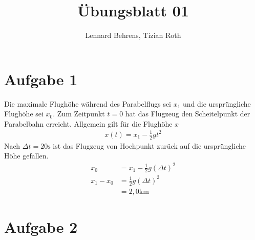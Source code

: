 \documentclass[a4paper,11pt]{article}
\title{Übungsblatt 01}
\author{Lennard Behrens, Tizian Roth}
\begin{document}
\maketitle

\section*{Aufgabe 1}
Die maximale Flughöhe während des Parabelflugs sei $x_1$ und die ursprüngliche Flughöhe sei $x_0$. Zum Zeitpunkt $t=0$ hat das Flugzeug den Scheitelpunkt der Parabelbahn erreicht. Allgemein gilt für die Flughöhe $x$
\begin{align*}
  x(t) = x_1 - \frac{1}{2} g t^2
\end{align*} 
Nach $\Delta t = 20 \mbox{s}$ ist das Flugzeug von Hochpunkt zurück auf die ursprüngliche Höhe gefallen. 
\begin{align*}
  x_0 &= x_1 - \frac{1}{2} g (\Delta t)^2 \\
  x_1 - x_0 &= \frac{1}{2} g (\Delta t)^2 \\
  &= 2,0 \mbox{km}
\end{align*}

\section*{Aufgabe 2}
\end{document}
